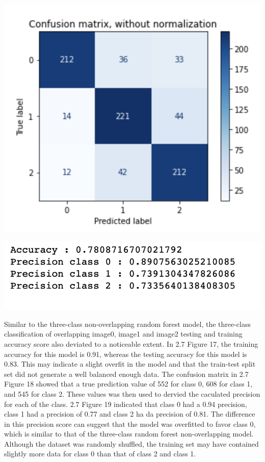 \documentclass[12pt]{article}
\begin{document}
\begin{multicols*}{2}
\begin{center}
		\includegraphics[scale=0.5]{../screenshot/Rf-Non-Overlapping012/cf.png}

		\includegraphics[scale=0.5]{../screenshot/Rf-Non-Overlapping012/calc_score.png}
	\end{center}


  \hspace*{5mm} Similar to the three-class non-overlapping random forest model, the three-class classification of overlapping 
  image0, image1 and image2 testing and training accuracy score also deviated to a noticeable extent.
  In 2.7 Figure 17, the training accuracy for this model is 0.91, whereas the testing accuracy for this model is 
  0.83. This may indicate a slight overfit in the model and that the train-test split set did not generate a well balanced enough data.
  The confusion matrix in 2.7 Figure 18 showed that a true prediction value of 552 for class 0, 608 for class 1, and 545 for class 2.
  These values was then used to dervied the caculated precision for each of the class. 2.7 Figure 19 indicated that class 0 had a 0.94 precision,
  class 1 had a precision of 0.77 and class 2 ha da precision of 0.81. The difference in this precision score can suggest that the model
  was overfitted to favor class 0, which is similar to that of the three-class random forest non-overlapping model. Although the dataset was 
  randomly shuffled, the training set may have contained slightly more data for class 0 than that of class 2 and class 1.  


\end{multicols*}
\end{document}

